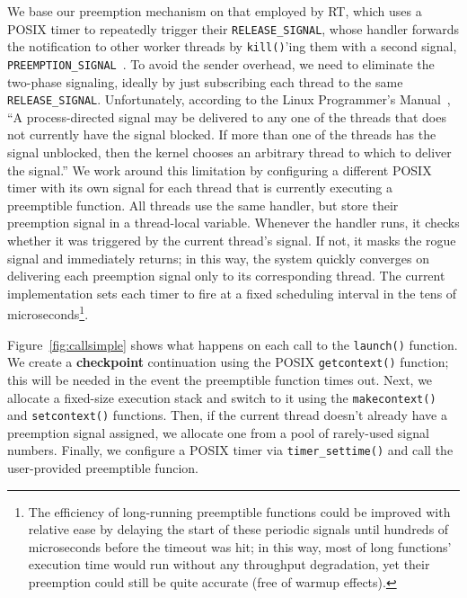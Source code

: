 We base our preemption mechanism on that employed by RT, which uses a POSIX timer to
repeatedly trigger their \texttt{RELEASE\_SIGNAL}, whose handler forwards the
notification to other worker threads by \texttt{kill()}'ing them with a second
signal, \texttt{PREEMPTION\_SIGNAL}~\cite{mollison:rtas2013}.  To avoid the sender
overhead, we need to eliminate the two-phase signaling, ideally by just subscribing
each thread to the same \texttt{RELEASE\_SIGNAL}.  Unfortunately, according to the
Linux Programmer's Manual~\cite{signal-manpage}, ``A process-directed signal may be
delivered to any one of the threads that does not currently have the signal blocked.
If more than one of the threads has the signal unblocked, then the kernel chooses an
arbitrary thread to which to deliver the signal.''  We work around this limitation by
configuring a different POSIX timer with its own signal for each thread that is
currently executing a preemptible function.  All threads use the same handler, but
store their preemption signal in a thread-local variable.  Whenever the handler runs,
it checks whether it was triggered by the current thread's signal.  If not, it masks
the rogue signal and immediately returns; in this way, the system quickly converges
on delivering each preemption signal only to its corresponding thread.  The current
implementation sets each timer to fire at a fixed scheduling interval in the tens of
microseconds\footnote{The efficiency of long-running preemptible functions could be
improved with relative ease by delaying the start of these periodic signals until
hundreds of microseconds before the timeout was hit; in this way, most of long
functions' execution time would run without any throughput degradation, yet their
preemption could still be quite accurate (free of warmup effects).}.

Figure~\ref{fig:callsimple} shows what happens on each call to the \texttt{launch()}
function.  We create a \textbf{checkpoint} continuation using the POSIX
\texttt{getcontext()} function; this will be needed in the event the preemptible
function times out.  Next, we allocate a fixed-size execution stack and switch to it
using the \texttt{makecontext()} and \texttt{setcontext()} functions.  Then, if the
current thread doesn't already have a preemption signal assigned, we allocate one
from a pool of rarely-used signal numbers.  Finally, we configure a POSIX timer via
\texttt{timer\_settime()} and call the user-provided preemptible funcion.


